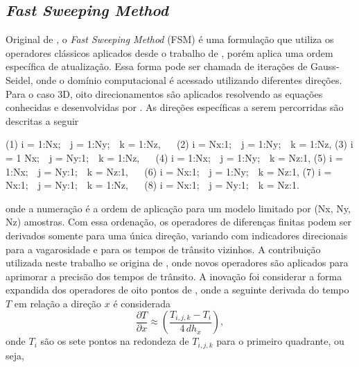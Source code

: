 \subsection*{\textit{Fast Sweeping Method}}

Original de , o \textit{Fast Sweeping Method} (FSM) é uma formulação que utiliza os operadores clássicos aplicados desde o trabalho de , porém aplica uma ordem específica de atualização. Essa forma pode ser chamada de iterações de Gauss-Seidel, onde o domínio computacional é acessado utilizando diferentes direções. Para o caso 3D, oito direcionamentos são aplicados resolvendo as equações conhecidas e desenvolvidas por . As direções específicas a serem percorridas são descritas a seguir
\begin{center}
\noindent (1) i = 1:Nx;$\,\,\,\,$ j = 1:Ny;$\,\,\,\,$ k = 1:Nz,$\,\,\,\,\,\,\,\,$ (2) i = Nx:1;$\,\,\,\,$ j = 1:Ny;$\,\,\,\,$ k = 1:Nz, \newline 
\noindent (3) i = 1 Nx;$\,\,\,\,$ j = Ny:1;$\,\,\,\,$ k = 1:Nz,$\,\,\,\,\,\,\,\,$ (4) i = 1:Nx;$\,\,\,\,$ j = 1:Ny;$\,\,\,\,$ k = Nz:1, \newline
\noindent (5) i = 1:Nx;$\,\,\,\,$ j = Ny:1;$\,\,\,\,$ k = Nz:1,$\,\,\,\,\,\,\,\,$ (6) i = Nx:1;$\,\,\,\,$ j = 1:Ny;$\,\,\,\,$ k = Nz:1, \newline 
\noindent (7) i = Nx:1;$\,\,\,\,$ j = Ny:1;$\,\,\,\,$ k = 1:Nz,$\,\,\,\,\,\,\,\,$ (8) i = Nx:1;$\,\,\,\,$ j = Ny:1;$\,\,\,\,$ k = Nz:1. $\,\,\,\,\,\,\,\,\,\,\,\,\,$
\end{center}
\noindent onde a numeração é a ordem de aplicação para um modelo limitado por (Nx, Ny, Nz) amostras. Com essa ordenação, os operadores de diferenças finitas podem ser derivados somente para uma única direção, variando com indicadores direcionais para a vagarosidade e para os tempos de trânsito vizinhos. A contribuição utilizada neste trabalho se origina de , onde novos operadores são aplicados para aprimorar a precisão dos tempos de trânsito. A inovação foi considerar a forma expandida dos operadores de oito pontos de , onde a seguinte derivada do tempo $T$ em relação a direção $x$ é considerada    
\begin{equation}
	\dfrac{\partial T}{\partial x} \approx \left(\dfrac{T_{i,j,k} - T_i}{4\, dh_x}\right),
	\label{fsm_8p_derivative}
\end{equation}
\noindent onde $T_i$ são os sete pontos na redondeza de $T_{i,j,k}$ para o primeiro quadrante, ou seja,
